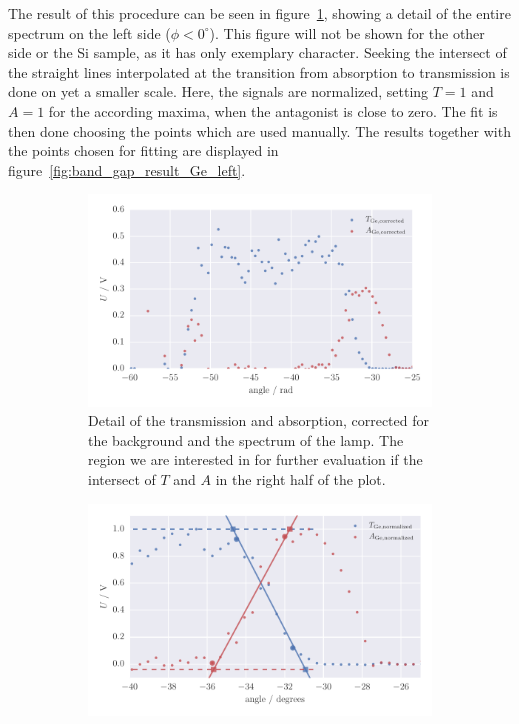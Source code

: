 The result of this procedure can be seen in figure~\ref{fig:band_gap_detail_Ge_left}, 
showing a detail of the entire spectrum on the left side ($\phi < 0^\circ$). 
This figure will not be shown for the other side or the Si sample, as 
it has only exemplary character. 
Seeking the intersect of the straight lines interpolated at the transition from 
absorption to transmission is done on yet a smaller scale. Here, 
the signals are normalized, setting $T = 1$ and $A = 1$ for the according maxima, 
when the antagonist is close to zero. The fit is then done choosing the 
points which are used manually. The results together with the points chosen for fitting 
are displayed in figure~\ref{fig:band_gap_result_Ge_left}. 
\begin{figure}
    \centering
    \begin{subfigure}[b]{\pltw}
        \includegraphics[width=1.0\linewidth]{figures/band_gap_detail_Ge_left}
        \caption{
            Detail of the transmission and absorption, corrected for the 
            background and the spectrum of the lamp. The region we are interested 
            in for further evaluation if the intersect of $T$ and $A$ in
            the right half of the plot. 
            }
        \label{fig:band_gap_detail_Ge_left}
    \end{subfigure}
    \begin{subfigure}[b]{\pltw}
        \includegraphics[width=1.0\linewidth]{figures/band_gap_result_Ge_left}

\end{subfigure}
\end{figure}

